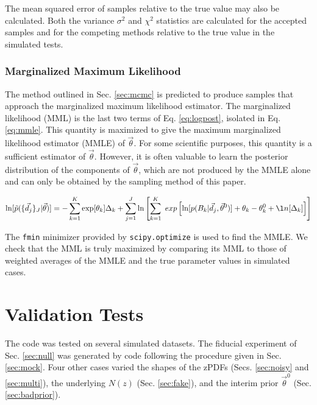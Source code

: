 \documentclass[preprint]{aastex}
\begin{document}
The mean squared error of samples relative to the true value may also be 
calculated.  Both the variance $\sigma^{2}$ and $\chi^{2}$ statistics are 
calculated for the accepted samples and for the competing methods relative to 
the true value in the simulated tests.

\clearpage
\subsubsection{Marginalized Maximum Likelihood}
\label{sec:mmle}

The method outlined in Sec. \ref{sec:mcmc} is predicted to produce samples that 
approach the marginalized maximum likelihood estimator.  The marginalized 
likelihood (MML) is the last two terms of Eq. \ref{eq:logpost}, isolated in Eq. 
\ref{eq:mmle}.  This quantity is maximized to give the maximum marginalized 
likelihood estimator (MMLE) of $\vec{\theta}$.  For some scientific purposes, 
this quantity is a sufficient estimator of $\vec{\theta}$.  However, it is 
often valuable to learn the posterior distribution of the components of 
$\vec{\theta}$, which are not produced by the MMLE alone and can only be 
obtained by the sampling method of this paper.

\begin{eqnarray}
\label{eq:mmle}
\ln[\tilde{p}(\{\vec{d}_{j}\}_{J}|\vec{\theta})] = 
-\sum_{k=1}^{K}\exp[\theta_{k}]\Delta_{k}+\sum_{j=1}^{J}\ln\left[\sum_{k=1}^{K}\
exp\left[\ln[p(B_{k}|\vec{d}_{j},\vec{\theta}^{0})]+\theta_{k}-\theta_{k}^{0}+\l
n[\Delta_{k}]\right]\right]
\end{eqnarray}

The \texttt{fmin} minimizer provided by \texttt{scipy.optimize} is used to find 
the MMLE.  We check that the MML is truly maximized by comparing its MML to 
those of weighted averages of the MMLE and the true parameter values in 
simulated cases.

\clearpage
\section{Validation Tests}
\label{sec:valid}

The code was tested on several simulated datasets.  The fiducial experiment of 
Sec. \ref{sec:null} was generated by code following the procedure given in Sec. 
\ref{sec:mock}.  Four other cases varied the shapes of the zPDFs (Secs. 
\ref{sec:noisy} and \ref{sec:multi}), the underlying $N(z)$ (Sec. 
\ref{sec:fake}), and the interim prior $\vec{\theta}^{0}$ (Sec. 
\ref{sec:badprior}).  
\end{document}
